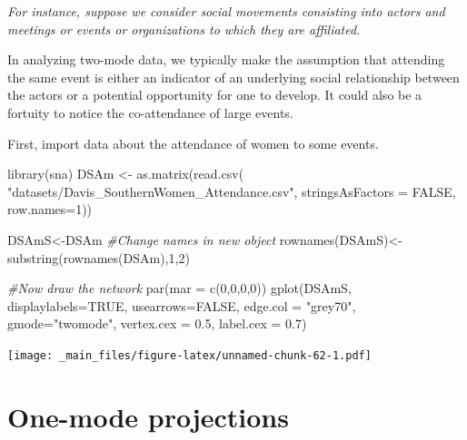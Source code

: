 \documentclass[
  notitlepage,
  onecolumn,
  openany]{book}
\newenvironment{Shaded}{\begin{snugshade}}{\end{snugshade}}
\newcommand{\AttributeTok}[1]{\textcolor[rgb]{0.77,0.63,0.00}{#1}}
\newcommand{\CommentTok}[1]{\textcolor[rgb]{0.56,0.35,0.01}{\textit{#1}}}
\newcommand{\ConstantTok}[1]{\textcolor[rgb]{0.00,0.00,0.00}{#1}}
\newcommand{\DecValTok}[1]{\textcolor[rgb]{0.00,0.00,0.81}{#1}}
\newcommand{\FloatTok}[1]{\textcolor[rgb]{0.00,0.00,0.81}{#1}}
\newcommand{\FunctionTok}[1]{\textcolor[rgb]{0.00,0.00,0.00}{#1}}
\newcommand{\NormalTok}[1]{#1}
\newcommand{\OtherTok}[1]{\textcolor[rgb]{0.56,0.35,0.01}{#1}}
\newcommand{\StringTok}[1]{\textcolor[rgb]{0.31,0.60,0.02}{#1}}
\begin{document}
\emph{For instance, suppose we consider social movements consisting into actors and meetings or events or organizations to which they are affiliated}.

In analyzing two-mode data, we typically make the assumption that attending the same event is either an indicator of an underlying social relationship between the actors or a potential opportunity for one to develop. It could also be a fortuity to notice the co-attendance of large events.

First, import data about the attendance of women to some events.

\begin{Shaded}
\begin{Highlighting}[]
\FunctionTok{library}\NormalTok{(sna)}
\NormalTok{DSAm }\OtherTok{\textless{}{-}} \FunctionTok{as.matrix}\NormalTok{(}\FunctionTok{read.csv}\NormalTok{(}
  \StringTok{"datasets/Davis\_SouthernWomen\_Attendance.csv"}\NormalTok{,}
  \AttributeTok{stringsAsFactors =} \ConstantTok{FALSE}\NormalTok{, }\AttributeTok{row.names=}\DecValTok{1}\NormalTok{))}

\NormalTok{DSAmS}\OtherTok{\textless{}{-}}\NormalTok{DSAm}
\CommentTok{\#Change names in new object}
\FunctionTok{rownames}\NormalTok{(DSAmS)}\OtherTok{\textless{}{-}}\FunctionTok{substring}\NormalTok{(}\FunctionTok{rownames}\NormalTok{(DSAm),}\DecValTok{1}\NormalTok{,}\DecValTok{2}\NormalTok{)}

\CommentTok{\#Now draw the network}
\FunctionTok{par}\NormalTok{(}\AttributeTok{mar =} \FunctionTok{c}\NormalTok{(}\DecValTok{0}\NormalTok{,}\DecValTok{0}\NormalTok{,}\DecValTok{0}\NormalTok{,}\DecValTok{0}\NormalTok{))}
\FunctionTok{gplot}\NormalTok{(DSAmS, }
      \AttributeTok{displaylabels=}\ConstantTok{TRUE}\NormalTok{, }
      \AttributeTok{usearrows=}\ConstantTok{FALSE}\NormalTok{, }
      \AttributeTok{edge.col =} \StringTok{"grey70"}\NormalTok{,}
      \AttributeTok{gmode=}\StringTok{"twomode"}\NormalTok{,}
      \AttributeTok{vertex.cex =} \FloatTok{0.5}\NormalTok{,}
      \AttributeTok{label.cex =} \FloatTok{0.7}\NormalTok{)}
\end{Highlighting}
\end{Shaded}

\texttt{[image: \_main\_files/figure-latex/unnamed-chunk-62-1.pdf]}

\hypertarget{one-mode-projections}{%
\section{One-mode projections}\label{one-mode-projections}}
\end{document}
